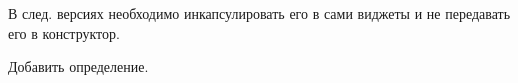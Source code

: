 
\begin{DoxyRefList}
\item[Class \mbox{\hyperlink{class_l_graphics_1_1_l_base_component}{L\+Graphics\+::L\+Base\+Component}} ]\label{todo__todo000001}%
%
В след. версиях необходимо инкапсулировать его в сами виджеты и не передавать его в конструктор.  
\item[Member \mbox{\hyperlink{class_l_graphics_1_1_l_error_a598e5af71074c5070941a213213423cb}{L\+Graphics\+::L\+Error\+::print\+To\+Display}} (const std\+::string \&error)]\label{todo__todo000002}%
%
Добавить определение. 
\end{DoxyRefList}